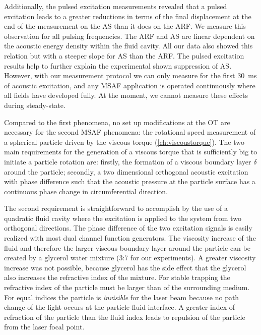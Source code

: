 Additionally, the pulsed excitation measurements revealed that a pulsed 
excitation leads to a greater reductions in terms of the final displacement at 
the end of the measurement on the AS than it does on the ARF. We measure this 
observation for all pulsing frequencies. The ARF and AS are linear dependent on 
the acoustic energy density within the fluid cavity. All our data also showed 
this relation but with a steeper slope for AS than the ARF. The pulsed 
excitation results help to further explain the experimental shown suppression 
of AS. However, with our measurement protocol we can only measure for the first 
\SI{30}{\ms} of acoustic excitation, and any MSAF application is operated 
continuously where all fields have developed fully. At the moment, we cannot 
measure these effects during steady-state.


Compared to the first phenomena, no set up modifications at the OT are 
necessary for the second MSAF phenomena: the rotational speed measurement of a 
spherical particle driven by the viscous torque (\cref{ch:viscoustorque}). The 
two main requirements for the generation of a viscous torque that is 
sufficiently big to initiate a particle rotation are: firstly, the formation of 
a viscous boundary layer $\delta$ around the particle; secondly, a two 
dimensional orthogonal acoustic excitation with phase difference such that the 
acoustic pressure at the particle surface has a continuous phase change in 
circumferential direction.

The second requirement is straightforward to accomplish by the use of a 
quadratic fluid cavity where the excitation is applied to the system from two 
orthogonal directions. The phase difference of the two excitation signals is 
easily realized with most dual channel function generators. The viscosity 
increase of the fluid and therefore the larger viscous boundary layer around 
the particle can be created by a glycerol water mixture (3:7 for our 
experiments). A greater viscosity increase was not possible, because glycerol 
has the side effect that the glycerol also increases the refractive index of 
the mixture.  For stable trapping the refractive index of the particle must be 
larger than of the surrounding medium. For equal indices the particle is 
\emph{invisible} for the laser beam because no path change of the light occurs 
at the particle-fluid interface. A greater index of refraction of the particle 
than the fluid index leads to repulsion of the particle from the laser focal 
point.

